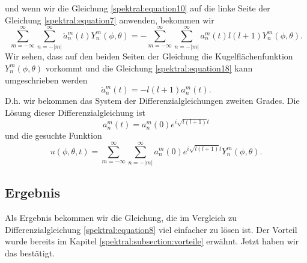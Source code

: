 und wenn wir die Gleichung \eqref{spektral:equation10} auf die linke Seite der Gleichung \eqref{spektral:equation7} anwenden, bekommen wir
\begin{equation}
\sum_{m=-\infty}^{\infty}\sum_{n=-|m|}^{\infty}\ddot{a}_n^m(t)Y_n^m(\phi, \theta) = -\sum_{m=-\infty}^{\infty}\sum_{n=-|m|}^{\infty}a_n^m(t)l(l+1)Y_n^m(\phi, \theta).
\label{spektral:equation18}
\end{equation}
Wir sehen, dass auf den beiden Seiten der Gleichung die Kugelflächenfunktion $Y_n^m(\phi, \theta)$ vorkommt und die Gleichung \eqref{spektral:equation18} kann umgeschrieben werden
\begin{equation}
\ddot{a}_n^m(t) = -l(l+1)a_n^m(t).
\label{spektral:equation19}
\end{equation}
D.h. wir bekommen das System der Differenzialgleichungen zweiten Grades.
Die Lösung dieser Differenzialgleichung ist
\begin{equation}
a_n^m(t) = a_n^m(0)e^{i\sqrt{l(l+1)}t}
\label{spektral:equation20}
\end{equation}
und die gesuchte Funktion
\begin{equation}
u(\phi, \theta, t) = \sum_{m=-\infty}^{\infty}\sum_{n=-|m|}^{\infty}a_n^m(0)e^{i\sqrt{l(l+1)}t}Y_n^m(\phi, \theta).
\label{spektral:equation21}
\end{equation}

\subsection{Ergebnis
\label{spektral:subsection:ergebnis}}

Als Ergebnis bekommen wir die Gleichung, die im Vergleich zu Differenzialgleichung \eqref{spektral:equation8} viel einfacher zu lösen ist. Der Vorteil wurde bereits im Kapitel \ref{spektral:subsection:vorteile} erwähnt. Jetzt haben wir das bestätigt.